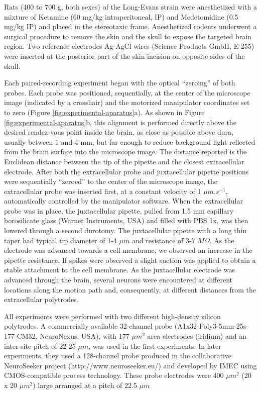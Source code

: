 Rats (400 to 700 g, both sexes) of the Long-Evans strain were anesthetized with a mixture of Ketamine (60 mg/kg intraperitoneal, IP) and Medetomidine (0.5 mg/kg IP) and placed in the stereotaxic frame. Anesthetized rodents underwent a surgical procedure to remove the skin and the skull to expose the targeted brain region. Two reference electrodes Ag-AgCl wires (Science Products GmbH, E-255) were inserted at the posterior part of the skin incision on opposite sides of the skull.

Each paired-recording experiment began with the optical “zeroing” of both probes. Each probe was positioned, sequentially, at the center of the microscope image (indicated by a crosshair) and the motorized manipulator coordinates set to zero (Figure \ref{fig:experimental-aparatus}a). As shown in Figure \ref{fig:experimental-aparatus}b, this alignment is performed directly above the desired rendez-vous point inside the brain, as close as possible above dura, usually between 1 and 4 mm, but far enough to reduce background light reflected from the brain surface into the microscope image. The distance reported is the Euclidean distance between the tip of the pipette and the closest extracellular electrode. After both the extracellular probe and juxtacellular pipette positions were sequentially “zeroed” to the center of the microscope image, the extracellular probe was inserted first, at a constant velocity of 1 $\mu m.s^{-1}$, automatically controlled by the manipulator software. When the extracellular probe was in place, the juxtacellular pipette, pulled from 1.5 mm capillary borosilicate glass (Warner Instruments, USA) and filled with PBS 1x, was then lowered through a second durotomy. The juxtacellular pipette with a long thin taper had typical tip diameter of 1-4 $\mu m$ and resistance of 3-7 $M\Omega$. As the electrode was advanced towards a cell membrane, we observed an increase in the pipette resistance. If spikes were observed a slight suction was applied to obtain a stable attachment to the cell membrane. As the juxtacellular electrode was advanced through the brain, several neurons were encountered at different locations along the motion path and, consequently, at different distances from the extracellular polytrodes.

All experiments were performed with two different high-density silicon polytrodes. A commercially available 32-channel probe (A1x32-Poly3-5mm-25s-177-CM32, NeuroNexus, USA), with 177 $\mu m^2$ area electrodes (iridium) and an inter-site pitch of 22-25 $\mu m$, was used in the first experiments. In later experiments, they used a 128-channel probe produced in the collaborative NeuroSeeker project (http://www.neuroseeker.eu/) and developed by IMEC using CMOS-compatible process technology. These probe electrodes were 400 $\mu m^2$ (20 x 20 $\mu m^2$) large arranged at a pitch of 22.5 $\mu m$


